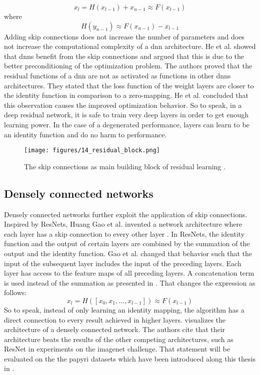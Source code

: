 \begin{equation}
	x_l = H(x_{l-1}) + x_{n-1} \approx F(x_{l-1})
	\label{equ:skip}
\end{equation}
where 
\begin{equation}
	H(y_{n -1}) \approx F(x_{n-1}) - x_{l-1}
\end{equation}
\noindent Adding skip connections does not increase the number of parameters and does not increase the computational complexity of a \ac{dnn} architecture. He et al. showed that \acp{dnn} benefit from the skip connections and argued that this is due to the better preconditioning of the optimization problem. The authors proved that the residual functions of a \ac{dnn} are not as activated as functions in other \acp{dnn} architectures. They stated that the loss function of the weight layers are closer to the identity function in comparison to a zero-mapping. He et al. concluded that this observation causes the improved optimization behavior. So to speak, in a deep residual network, it is safe to train very deep layers in order to get enough learning power. In the case of a degenerated performance, layers can learn to be an identity function and do no harm to performance.
%
\begin{figure}[t]
	\centering
	\texttt{[image: figures/14\_residual\_block.png]}
	\caption{The skip connections as main building block of residual learning \cite{He15}.}
	\label{fig:residual}
\end{figure} 
%
\subsection{Densely connected networks}
\label{subsec:dcn}
Densely connected networks further exploit the application of skip connections. Inspired by ResNets, Huang Gao et al. invented a network architecture where each layer has a skip connection to every other layer \cite{Huang17}. In ResNets, the identity function and the output of certain layers are combined by the summation of the output and the identity function. Gao et al. changed that behavior such that the input of the subsequent layer includes the input of the preceding layers. Each layer has access to the feature maps of all preceding layers. A concatenation term is used instead of the summation as presented in . That changes the expression as follows:
\begin{equation}
	\label{equ:skip2}
	x_l = H([x_{0},x_{1},...,x_{l-1}]) \approx F(x_{l-1})
\end{equation}
So to speak, instead of only learning an identity mapping, the algorithm has a direct connection to every result achieved in higher layers.  visualizes the architecture of a densely connected network. The authors cite that their architecture beats the results of the other competing architectures, such as ResNet in experiments on the \ac{imagenet} challenge. That statement will be evaluated on the the papyri datasets which have been introduced along this thesis in  . 

